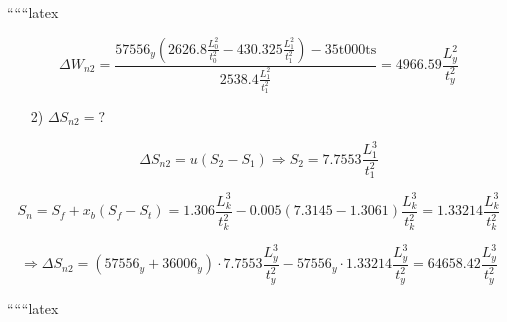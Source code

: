 ``````latex


\[
\Delta W_{n2} = \frac{57556_y \left( 2626.8 \frac{L^2_0}{t^2_0} - 430.325 \frac{L^2_1}{t^2_1} \right) - 35 \text{t000ts}}{2538.4 \frac{L^2_1}{t^2_1}} = 4966.59 \frac{L^2_y}{t^2_y}
\]

\begin{itemize}
    \item[2)] $\Delta S_{n2} = ?$
\end{itemize}

\[
\Delta S_{n2} = u(S_2 - S_1) \Rightarrow S_2 = 7.7553 \frac{L^3_1}{t^2_1}
\]

\[
S_n = S_f + x_b (S_f - S_t) = 1.306 \frac{L^3_k}{t^2_k} - 0.005 \left( 7.3145 - 1.3061 \right) \frac{L^3_k}{t^2_k} = 1.33214 \frac{L^3_k}{t^2_k}
\]

\[
\Rightarrow \Delta S_{n2} = \left( 57556_y + 36006_y \right) \cdot 7.7553 \frac{L^3_y}{t^2_y} - 57556_y \cdot 1.33214 \frac{L^3_y}{t^2_y} = 64658.42 \frac{L^3_y}{t^2_y}
\]

``````latex


